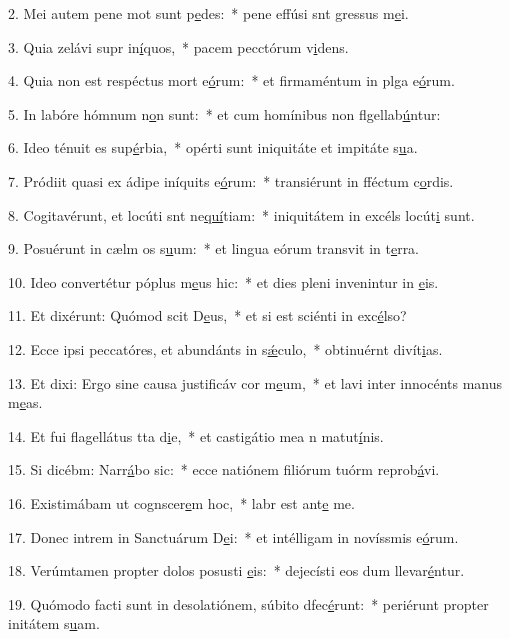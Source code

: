 2. Mei autem pene mot sunt p\uline{e}des:~* pene effúsi snt gressus m\uline{e}i.\par 
3. Quia zelávi supr in\uline{í}quos,~* pacem pecctórum v\uline{i}dens.\par 
4. Quia non est respéctus mort e\uline{ó}rum:~* et firmaméntum in plga e\uline{ó}rum.\par 
5. In labóre hómnum n\uline{o}n sunt:~* et cum homínibus non flgellab\uline{ú}ntur:\par 
6. Ideo ténuit es sup\uline{é}rbia,~* opérti sunt iniquitáte et impitáte s\uline{u}a.\par 
7. Pródiit quasi ex ádipe iníquits e\uline{ó}rum:~* transiérunt in fféctum c\uline{o}rdis.\par 
8. Cogitavérunt, et locúti snt ne\uline{quí}tiam:~* iniquitátem in excéls locút\uline{i} sunt.\par 
9. Posuérunt in cælm os s\uline{u}um:~* et lingua eórum transvit in t\uline{e}rra.\par 
10. Ideo convertétur póplus m\uline{e}us hic:~* et dies pleni invenintur in \uline{e}is.\par 
11. Et dixérunt: Quómod scit D\uline{e}us,~* et si est sciénti in exc\uline{é}lso?\par 
12. Ecce ipsi peccatóres, et abundánts in s\uline{ǽ}culo,~* obtinuérnt divít\uline{i}as.\par 
13. Et dixi: Ergo sine causa justificáv cor m\uline{e}um,~* et lavi inter innocénts manus m\uline{e}as.\par 
14. Et fui flagellátus tta d\uline{i}e,~* et castigátio mea n matut\uline{í}nis.\par 
15. Si dicébm: Narr\uline{á}bo sic:~* ecce natiónem filiórum tuórm reprob\uline{á}vi.\par 
16. Existimábam ut cognscer\uline{e}m hoc,~* labr est ant\uline{e} me.\par 
17. Donec intrem in Sanctuárum D\uline{e}i:~* et intélligam in novíssmis e\uline{ó}rum.\par 
18. Verúmtamen propter dolos posusti \uline{e}is:~* dejecísti eos dum llevar\uline{é}ntur.\par 
19. Quómodo facti sunt in desolatiónem, súbito dfec\uline{é}runt:~* periérunt propter initátem s\uline{u}am.\par 
